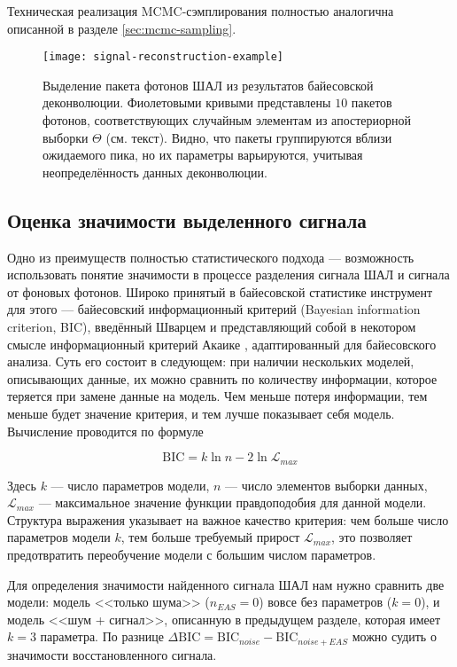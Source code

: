 Техническая реализация MCMC-сэмплирования полностью аналогична описанной в разделе \ref{sec:mcmc-sampling}.

\begin{figure}
	\centering
	\texttt{[image: signal-reconstruction-example]}
	\caption{Выделение пакета фотонов ШАЛ из результатов байесовской деконволюции. Фиолетовыми кривыми представлены $10$ пакетов фотонов, соответствующих случайным элементам из апостериорной выборки $\Theta$ (см. текст). Видно, что пакеты группируются вблизи ожидаемого пика, но их параметры варьируются, учитывая неопределённость данных деконволюции.}
	\label{pic:signal-reconstruction-example}
\end{figure}


\subsection{Оценка значимости выделенного сигнала}

Одно из преимуществ полностью статистического подхода --- возможность использовать понятие значимости в процессе разделения сигнала ШАЛ и сигнала от фоновых фотонов. Широко принятый в байесовской статистике инструмент для этого --- байесовский информационный критерий (Bayesian information criterion, BIC), введённый Шварцем \cite{Schwarz1978} и представляющий собой в некотором смысле информационный критерий Акаике \cite{Akaike1974}, адаптированный для байесовского анализа. Суть его состоит в следующем: при наличии нескольких моделей, описывающих данные, их можно сравнить по количеству информации, которое теряется при замене данные на модель. Чем меньше потеря информации, тем меньше будет значение критерия, и тем лучше показывает себя модель. Вычисление проводится по формуле

\begin{equation}
	\mathrm{BIC} = k \ln n - 2 \ln \mathcal{L}_{max}
\end{equation}

Здесь $k$ --- число параметров модели, $n$ --- число элементов выборки данных, $\mathcal{L}_{max}$ --- максимальное значение функции правдоподобия для данной модели. Структура выражения указывает на важное качество критерия: чем больше число параметров модели $k$, тем больше требуемый прирост $\mathcal{L}_{max}$, это позволяет предотвратить переобучение модели с большим числом параметров.

Для определения значимости найденного сигнала ШАЛ нам нужно сравнить две модели: модель <<только шума>> ($n_{EAS} = 0$) вовсе без параметров ($k=0$), и модель <<шум + сигнал>>, описанную в предыдущем разделе, которая имеет $k=3$ параметра. По разнице $ \Delta \mathrm{BIC} = \mathrm{BIC}_{noise} - \mathrm{BIC}_{noise + EAS}$ можно судить о значимости восстановленного сигнала.

